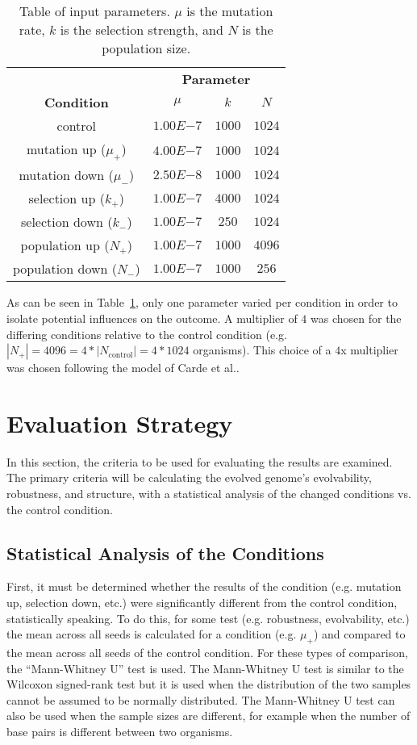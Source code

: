 \begin{table}[h]
	\centering
	\begin{tabular}{|c||c|c|c|}
		\hline
		 & \multicolumn{3}{c|}{\textbf{Parameter}} \\
		\cline{2-4}
		\textbf{Condition} &$\mu$ & $k$ & $N$ \\
		\hline
		control & $1.00E{-7}$ & $1000$ & $1024$ \\
		\hline
		mutation up ($\mu_+$) & $4.00E{-7}$ & $1000$ & $1024$ \\
		\hline
		mutation down ($\mu_-$) & $2.50E{-8}$ & $1000$ & $1024$ \\
		\hline
		selection up ($k_+$) & $1.00E{-7}$ & $4000$ & $1024$ \\
		\hline
		selection down ($k_-$) & $1.00E{-7}$ & $250$ & $1024$ \\
		\hline
		population up ($N_+$) & $1.00E{-7}$ & $1000$ & $4096$ \\
		\hline
		population down ($N_-$) & $1.00E{-7}$ & $1000$ & $256$ \\		
		\hline
	\end{tabular}
	\caption[Table of parameters]{Table of input parameters. $\mu$ is the mutation rate, $k$ is the selection strength, and $N$ is the population size.}
	\label{table:input_parameters}
\end{table}
As can be seen in Table~\ref{table:input_parameters}, only one parameter varied per condition in order to isolate potential influences on the outcome. A multiplier of $4$ was chosen for the differing conditions relative to the control condition (e.g. $|N_+| = 4096 = 4*|N_\text{control}| = 4*1024$ organisms). This choice of a $4$x multiplier was chosen following the model of Carde et al.\cite{carde.2019}. 


\section{Evaluation Strategy}
In this section, the criteria to be used for evaluating the results are examined. The primary criteria will be calculating the evolved genome's evolvability, robustness, and structure, with a statistical analysis of the changed conditions vs. the control condition. 

\subsection{Statistical Analysis of the Conditions}
First, it must be determined whether the results of the condition (e.g. mutation up, selection down, etc.) were significantly different from the control condition, statistically speaking. To do this, for some test (e.g. robustness, evolvability, etc.) the mean across all seeds is calculated for a condition (e.g. $\mu_+$) and compared to the mean across all seeds of the control condition. For these types of comparison, the ``Mann-Whitney U'' test is used. The Mann-Whitney U test is similar to the Wilcoxon signed-rank test but it is used when the distribution of the two samples cannot be assumed to be normally distributed. The Mann-Whitney U test can also be used when the sample sizes are different, for example when the number of base pairs is different between two organisms.

